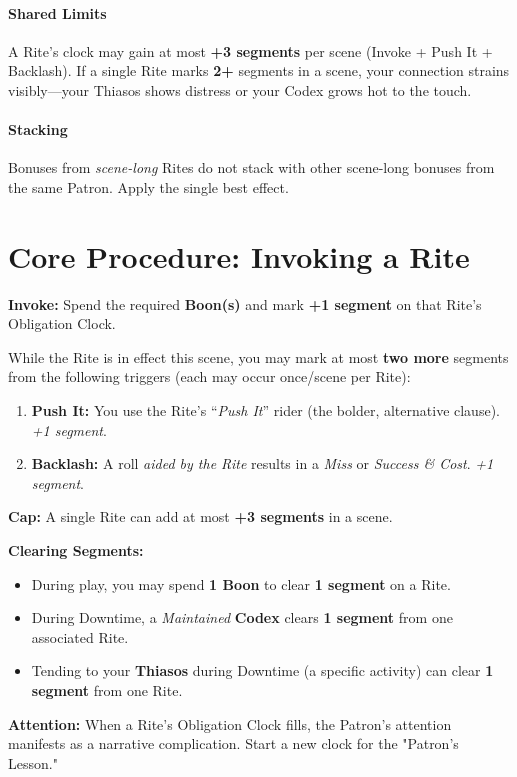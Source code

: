 \documentclass[12pt,twoside]{book}
\begin{document}
\paragraph{Shared Limits}
A Rite’s clock may gain at most \textbf{+3 segments} per scene (Invoke + Push It + Backlash). If a single Rite marks \textbf{2+} segments in a scene, your connection strains visibly—your Thiasos shows distress or your Codex grows hot to the touch.

\paragraph{Stacking}
Bonuses from \emph{scene-long} Rites do not stack with other scene-long bonuses from the same Patron. Apply the single best effect.

\section{Core Procedure: Invoking a Rite}
\label{sec:rite-procedure}
\textbf{Invoke:} Spend the required \textbf{Boon(s)} and mark \textbf{+1 segment} on that Rite's Obligation Clock.

While the Rite is in effect this scene, you may mark at most \textbf{two more} segments from the following triggers (each may occur once/scene per Rite):
\begin{enumerate}
  \item \textbf{Push It:} You use the Rite's ``\emph{Push It}'' rider (the bolder, alternative clause). \emph{+1 segment}.
  \item \textbf{Backlash:} A roll \emph{aided by the Rite} results in a \emph{Miss} or \emph{Success \& Cost}. \emph{+1 segment}.
\end{enumerate}
\textbf{Cap:} A single Rite can add at most \textbf{+3 segments} in a scene.

\textbf{Clearing Segments:}
\begin{itemize}
  \item During play, you may spend \textbf{1 Boon} to clear \textbf{1 segment} on a Rite.
  \item During Downtime, a \emph{Maintained} \textbf{Codex} clears \textbf{1 segment} from one associated Rite.
  \item Tending to your \textbf{Thiasos} during Downtime (a specific activity) can clear \textbf{1 segment} from one Rite.
\end{itemize}

\textbf{Attention:} When a Rite's Obligation Clock fills, the Patron's attention manifests as a narrative complication. Start a new clock for the "Patron's Lesson."
\end{document}
